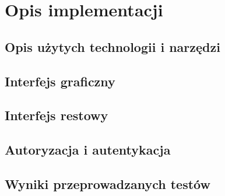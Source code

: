 \chapter{Opis implementacji}
\label{cha:uzywaneTechnologie}

\section{Opis użytych technologii i narzędzi}
\label{sec:technology}

\section{Interfejs graficzny}
\label{sec:interfejsGraficzny}

\section{Interfejs restowy}
\label{sec:interfejsRestowy}

\section{Autoryzacja i autentykacja}
\label{sec:autoryzacjaAutentykacja}

\section{Wyniki przeprowadzanych testów}
\label{sec;testResult}
